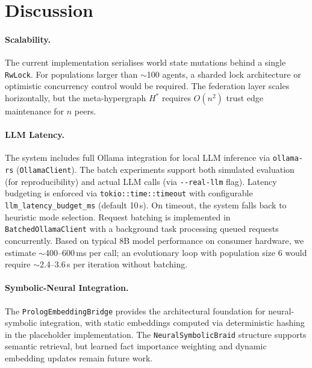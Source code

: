 \documentclass[11pt]{article}
\begin{document}
\section{Discussion}
\nopagebreak[4]
\label{sec:discussion}

\paragraph{Scalability.}
The current implementation serialises world state mutations behind a single
\texttt{RwLock}. For populations larger than $\sim$100 agents, a sharded
lock architecture or optimistic concurrency control would be required. The
federation layer scales horizontally, but the meta-hypergraph $H^*$ requires
$O(n^2)$ trust edge maintenance for $n$ peers.

\paragraph{LLM Latency.}
The system includes full Ollama integration for local LLM inference via \texttt{ollama-rs}
(\texttt{OllamaClient}). The batch experiments support both simulated evaluation
(for reproducibility) and actual LLM calls (via \texttt{{-}{-}real-llm} flag).
Latency budgeting is enforced via \texttt{tokio::time::timeout} with configurable
\texttt{llm\_latency\_budget\_ms} (default 10\,s). On timeout, the system falls back
to heuristic mode selection. Request batching is implemented in
\texttt{BatchedOllamaClient} with a background task processing queued requests
concurrently. Based on typical 8B model performance on consumer hardware, we estimate
$\sim$400--600\,ms per call; an evolutionary loop with population size 6 would
require $\sim$2.4--3.6\,s per iteration without batching.

\paragraph{Symbolic-Neural Integration.}
The \texttt{PrologEmbeddingBridge} provides the architectural foundation for
neural-symbolic integration, with static embeddings computed via deterministic
hashing in the placeholder implementation. The \texttt{NeuralSymbolicBraid}
structure supports semantic retrieval, but learned fact importance weighting and
dynamic embedding updates remain future work.
\end{document}
